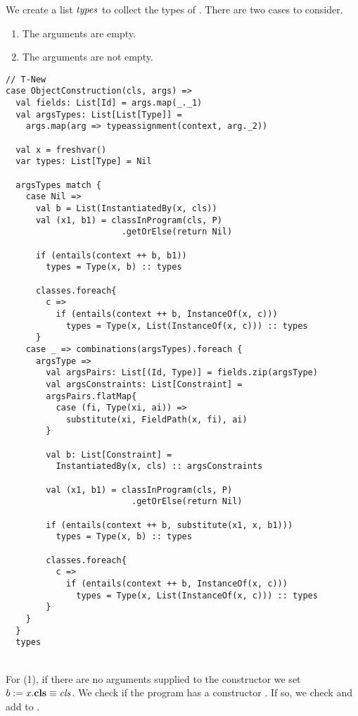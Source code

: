 We create a list $\mathit{types}$ to collect
the types of .
There are two cases to consider.
%
\begin{enumerate}
  \item The arguments are empty.
  \item The arguments are not empty.
\end{enumerate}
\newpage
%
\begin{lstlisting}[caption={Case T-New},label=lst:scala-typeass-new,captionpos=b,frame={lines}]
// T-New
case ObjectConstruction(cls, args) =>
  val fields: List[Id] = args.map(_._1)
  val argsTypes: List[List[Type]] =
    args.map(arg => typeassignment(context, arg._2))

  val x = freshvar()
  var types: List[Type] = Nil

  argsTypes match {
    case Nil =>
      val b = List(InstantiatedBy(x, cls))
      val (x1, b1) = classInProgram(cls, P)
                       .getOrElse(return Nil)

      if (entails(context ++ b, b1))
        types = Type(x, b) :: types

      classes.foreach{
        c =>
          if (entails(context ++ b, InstanceOf(x, c)))
            types = Type(x, List(InstanceOf(x, c))) :: types
      }
    case _ => combinations(argsTypes).foreach {
      argsType =>
        val argsPairs: List[(Id, Type)] = fields.zip(argsType)
        val argsConstraints: List[Constraint] =
        argsPairs.flatMap{
          case (fi, Type(xi, ai)) =>
            substitute(xi, FieldPath(x, fi), ai)
        }

        val b: List[Constraint] =
          InstantiatedBy(x, cls) :: argsConstraints

        val (x1, b1) = classInProgram(cls, P)
                         .getOrElse(return Nil)

        if (entails(context ++ b, substitute(x1, x, b1)))
          types = Type(x, b) :: types

        classes.foreach{
          c =>
            if (entails(context ++ b, InstanceOf(x, c)))
              types = Type(x, List(InstanceOf(x, c))) :: types
        }
    }
  }
  types
\end{lstlisting}
\newpage
%
\quad\\
For (1), if there are no arguments supplied to the constructor
we set $b := \mathit{x}.\textbf{cls} \equiv \mathit{cls}$.
We check if the program has a constructor .
If so, we check 
and add  to .
